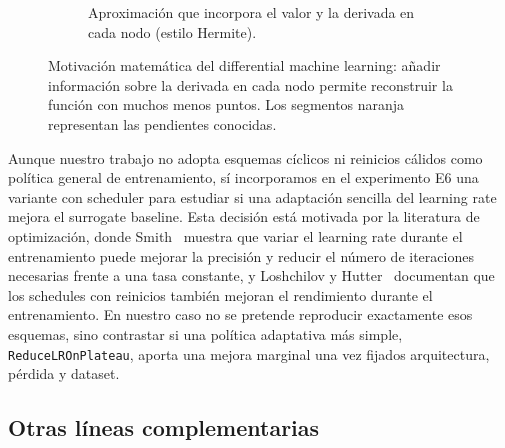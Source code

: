 \documentclass[11pt,a4paper]{article}
\begin{document}
\begin{figure}[ht]
\begin{subfigure}[t]{0.46\textwidth}
\caption{Aproximación que incorpora el valor y la derivada en cada nodo (estilo Hermite).}
\end{subfigure}
\caption{Motivación matemática del differential machine learning: añadir información sobre la derivada en cada nodo permite reconstruir la función con muchos menos puntos. Los segmentos naranja representan las pendientes conocidas.}
\label{fig:hermite}
\end{figure}


Aunque nuestro trabajo no adopta esquemas cíclicos ni reinicios cálidos como política general de entrenamiento, sí incorporamos en el experimento E6 una variante con scheduler para estudiar si una adaptación sencilla del learning rate mejora el surrogate baseline. Esta decisión está motivada por la literatura de optimización, donde Smith~\cite{smith2015} muestra que variar el learning rate durante el entrenamiento puede mejorar la precisión y reducir el número de iteraciones necesarias frente a una tasa constante, y Loshchilov y Hutter~\cite{loshchilov2017} documentan que los schedules con reinicios también mejoran el rendimiento durante el entrenamiento. En nuestro caso no se pretende reproducir exactamente esos esquemas, sino contrastar si una política adaptativa más simple, \texttt{ReduceLROnPlateau}, aporta una mejora marginal una vez fijados arquitectura, pérdida y dataset.

\subsection{Otras líneas complementarias}
\end{document}
